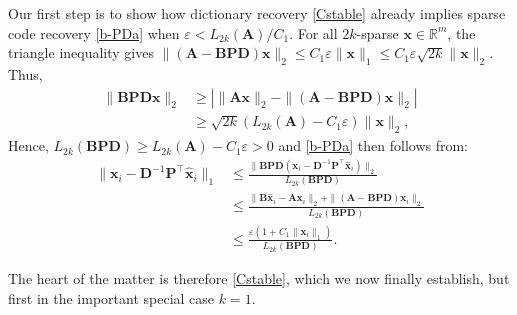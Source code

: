 \documentclass[9pt,twocolumn]{pnas-new}
\begin{document}
Our first step is to show how dictionary recovery \eqref{Cstable} already implies sparse code recovery \eqref{b-PDa} when $\varepsilon < L_{2k}(\mathbf{A}) / C_1$. For all $2k$-sparse $\mathbf{x} \in \mathbb{R}^m$, the triangle inequality gives \mbox{$\|(\mathbf{A}-\mathbf{BPD})\mathbf{x}\|_2  \leq C_1\varepsilon \|\mathbf{x}\|_1 \leq C_1 \varepsilon \sqrt{2k}  \|\mathbf{x}\|_2$}. Thus, 
\begin{align*}
\|\mathbf{BPD}\mathbf{x}\|_2 
&\geq | \|\mathbf{A}\mathbf{x}\|_2 - \|(\mathbf{A}-\mathbf{BPD})\mathbf{x}\|_2 | \\
&\geq \sqrt{2k} (L_{2k}(\mathbf{A}) -  C_1\varepsilon) \|\mathbf{x}\|_2,
\end{align*}
%
Hence, $L_{2k}(\mathbf{BPD}) \geq L_{2k}(\mathbf{A}) - C_1\varepsilon  > 0$ and \eqref{b-PDa} then follows from:
\begin{align*}
\|\mathbf{x}_i - \mathbf{D}^{-1}\mathbf{P}^{\top}\mathbf{\hat x}_i \|_1
&\leq \frac{\|\mathbf{BPD}(\mathbf{x}_i - \mathbf{D}^{-1}\mathbf{P}^{\top}\mathbf{\hat x}_i)\|_2}{L_{2k}(\mathbf{BPD})} \\
&\leq \frac{\|\mathbf{B}\mathbf{\hat x}_i - \mathbf{A}\mathbf{x}_i\|_2 + \|(\mathbf{A} - \mathbf{BPD})\mathbf{x}_i\|_2}{L_{2k}(\mathbf{BPD})} \\
&\leq \frac{\varepsilon (1+C_1 \|\mathbf{x}_i\|_1)}{L_{2k}(\mathbf{BPD})}.
\end{align*}

The heart of the matter is therefore \eqref{Cstable}, which we now finally establish, but first in the important special case $k = 1$.

\end{document}
